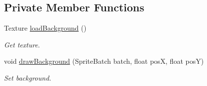 \subsection*{Private Member Functions}
\begin{DoxyCompactItemize}
\item 
Texture \hyperlink{classnl_1_1arjanfrans_1_1mario_1_1view_1_1WorldRenderer_a43f69b3995ab2dc9c82a7c9f78f58821}{load\+Background} ()
\begin{DoxyCompactList}\small\item\em Get texture. \end{DoxyCompactList}\item 
void \hyperlink{classnl_1_1arjanfrans_1_1mario_1_1view_1_1WorldRenderer_a1d8187e70a46eefc5e67a1bec9cfd0cc}{draw\+Background} (Sprite\+Batch batch, float posX, float posY)
\begin{DoxyCompactList}\small\item\em Set background. \end{DoxyCompactList}\end{DoxyCompactItemize}

